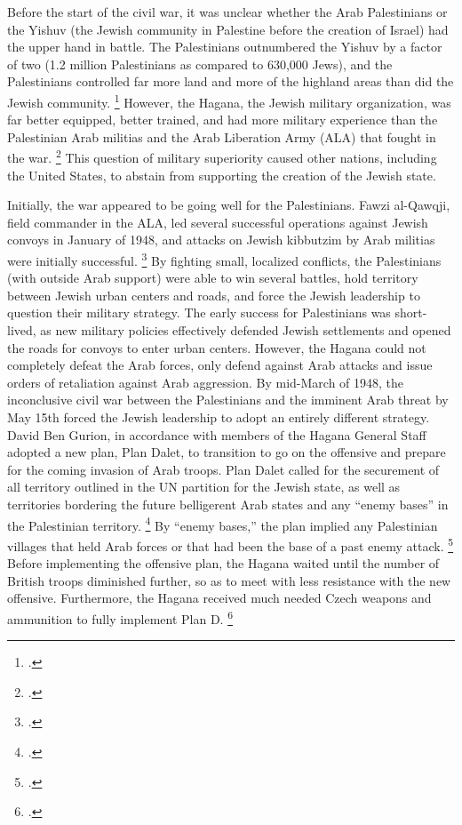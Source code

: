 \documentclass{turabian-researchpaper}
\begin{document}
Before the start of the civil war, it was unclear whether the Arab Palestinians or the Yishuv (the Jewish community in Palestine before the creation of Israel) had the upper hand in battle.  The Palestinians outnumbered the Yishuv by a factor of two (1.2 million Palestinians as compared to 630,000 Jews), and the Palestinians controlled far more land and more of the highland areas than did the Jewish community.
\footcite[][30]{bartal}
However, the Hagana, the Jewish military organization, was far better equipped, better trained, and had more military experience than the Palestinian Arab militias and the Arab Liberation Army (ALA) that fought in the war.
\footcite[][81]{morris}
This question of military superiority caused other nations, including the United States, to abstain from supporting the creation of the Jewish state.

Initially, the war appeared to be going well for the Palestinians.  Fawzi al-Qawqji, field commander in the ALA, led several successful operations against Jewish convoys in January of 1948, and attacks on Jewish kibbutzim by Arab militias were initially successful.
\footcite[][79]{pappe}
By fighting small, localized conflicts, the Palestinians (with outside Arab support) were able to win several battles, hold territory between Jewish urban centers and roads, and force the Jewish leadership to question their military strategy.  The early success for Palestinians was short-lived, as new military policies effectively defended Jewish settlements and opened the roads for convoys to enter urban centers.  However, the Hagana could not completely defeat the Arab forces, only defend against Arab attacks and issue orders of retaliation against Arab aggression.
By mid-March of 1948, the inconclusive civil war between the Palestinians and the imminent Arab threat by May 15th forced the Jewish leadership to adopt an entirely different strategy.  David Ben Gurion, in accordance with members of the Hagana General Staff adopted a new plan, Plan Dalet, to transition to go on the offensive and prepare for the coming invasion of Arab troops.  Plan Dalet called for the securement of all territory outlined in the UN partition for the Jewish state, as well as territories bordering the future belligerent Arab states and any “enemy bases” in the Palestinian territory.
\footcite{khalidi}
By “enemy bases,” the plan implied any Palestinian villages that held Arab forces or that had been the base of a past enemy attack.
\footcite[][119]{morris}
Before implementing the offensive plan, the Hagana waited until the number of British troops diminished further, so as to meet with less resistance with the new offensive.  Furthermore, the Hagana received much needed Czech weapons and ammunition to fully implement Plan D.
\footcite[][116]{morris}
\end{document}
